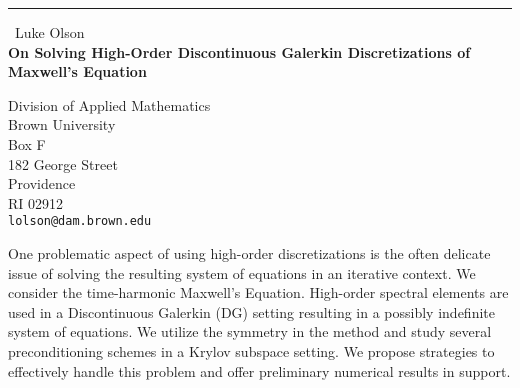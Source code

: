\documentclass{report}
\begin{document}
\begin{center}
\rule{6in}{1pt} \
{\large Luke Olson \\
{\bf On Solving High-Order Discontinuous Galerkin Discretizations of Maxwell's Equation}}

Division of Applied Mathematics \\ Brown University \\ Box F \\ 182 George Street \\ Providence \\ RI 02912
\\
{\tt lolson@dam.brown.edu}\end{center}

One problematic aspect of using high-order discretizations is the often
delicate issue of solving the resulting system of equations in an
iterative context. We consider the time-harmonic Maxwell's Equation.
High-order spectral elements are used in a Discontinuous Galerkin (DG)
setting resulting in a possibly indefinite system of equations. We
utilize the symmetry in the method and study several preconditioning
schemes in a Krylov subspace setting. We propose strategies to
effectively handle this problem and offer preliminary numerical results
in support.
\end{document}

